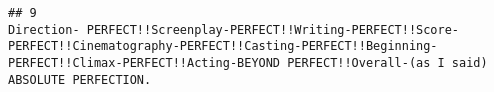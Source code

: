 \documentclass[
]{article}
\begin{document}
\begin{verbatim}
## 9                                                                                                                                                                                                                                                                                                                                                                                                                                                                                                                                                                                                                                                                                                                                                                                                                                                                                                                                                                                                                                                                                                                                                                                                                                                                                                                                                                                                                                                                                                                                                                                                                                                                                                                                                                                                                                                                                                                                                                                               Direction- PERFECT!!Screenplay-PERFECT!!Writing-PERFECT!!Score-PERFECT!!Cinematography-PERFECT!!Casting-PERFECT!!Beginning-PERFECT!!Climax-PERFECT!!Acting-BEYOND PERFECT!!Overall-(as I said) ABSOLUTE PERFECTION.

\end{verbatim}
\end{document}

